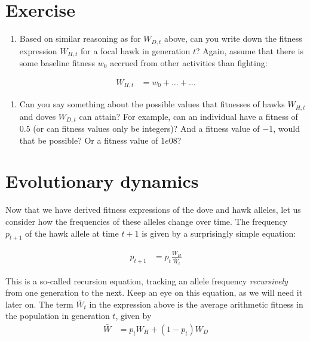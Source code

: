 \documentclass[
]{book}
\providecommand{\tightlist}{%
  \setlength{\itemsep}{0pt}\setlength{\parskip}{0pt}}
\begin{document}
\section{Exercise}\label{exercise-2}

\begin{enumerate}
\def\labelenumi{\arabic{enumi}.}
\tightlist
\item
  Based on similar reasoning as for \(W_{D,t}\) above, can you write down the fitness expression \(W_{H,t}\) for a focal hawk in generation \(t\)? Again, assume that there is some baseline fitness \(w_{0}\) accrued from other activities than fighting:
\end{enumerate}

\begin{align}
W_{H,t} &= w_{0} + \ldots + \ldots
\end{align}

\begin{enumerate}
\def\labelenumi{\arabic{enumi}.}
\setcounter{enumi}{1}
\tightlist
\item
  Can you say something about the possible values that fitnesses of hawks \(W_{H,t}\) and doves \(W_{D,t}\) can attain? For example, can an individual have a fitness of \(0.5\) (or can fitness values only be integers)? And a fitness value of \(-1\), would that be possible? Or a fitness value of \(1e08\)?
\end{enumerate}

\section{Evolutionary dynamics}\label{evolutionary-dynamics}

Now that we have derived fitness expressions of the dove and hawk alleles, let us consider how the frequencies of these alleles change over time. The frequency \(p_{t+1}\) of the hawk allele at time \(t+1\) is given by a surprisingly simple equation:

\begin{align}
p_{t+1} &= p_{t} \frac{W_{H}}{\bar{W}_{t}}
\end{align}

This is a so-called recursion equation, tracking an allele frequency \emph{recursively} from one generation to the next. Keep an eye on this equation, as we will need it later on. The term \(\bar{W}_{t}\) in the expression above is the average arithmetic fitness in the population in generation \(t\), given by
\begin{align}
\bar{W} &= p_{t} W_{H} + \left(1 - p_{t} \right ) W_{D}
\end{align}
\end{document}
